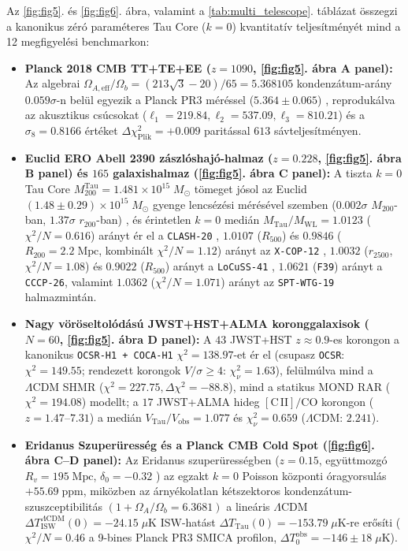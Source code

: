 \documentclass[11pt,a4paper]{article}
\begin{document}
Az \ref{fig:fig5}. és \ref{fig:fig6}. ábra, valamint a \ref{tab:multi_telescope}. táblázat összegzi a kanonikus zéró paraméteres Tau Core ($k = 0$) kvantitatív teljesítményét mind a 12 megfigyelési benchmarkon:
\begin{itemize}
  \item \textbf{Planck 2018 CMB TT+TE+EE ($z = 1090$, \ref{fig:fig5}. ábra A panel):} Az algebrai $\Omega_{A,\mathrm{eff}}/\Omega_b = (213\sqrt{3}-20)/65 = 5.368105$ kondenzátum-arány $0.059\sigma$-n belül egyezik a Planck PR3 méréssel ($5.364 \pm 0.065$) \cite{Planck2018VI}, reprodukálva az akusztikus csúcsokat ($\ell_1 = 219.84, \ell_2 = 537.09, \ell_3 = 810.21$) és a $\sigma_8 = 0.8166$ értéket $\Delta\chi^2_{\mathrm{Plik}} = +0.009$ paritással $613$ sávteljesítményen.
  \item \textbf{Euclid ERO Abell 2390 zászlóshajó-halmaz ($z = 0.228$, \ref{fig:fig5}. ábra B panel) és $165$ galaxishalmaz (\ref{fig:fig5}. ábra C panel):} A tiszta $k = 0$ Tau Core $M_{200}^{\mathrm{Tau}} = 1.481 \times 10^{15}\;M_\odot$ tömeget jósol az Euclid $(1.48 \pm 0.29)\times 10^{15}\;M_\odot$ gyenge lencsézési mérésével szemben ($0.002\sigma$ $M_{200}$-ban, $1.37\sigma$ $r_{200}$-ban) \cite{EuclidEROAbell2390}, és érintetlen $k = 0$ medián $M_{\mathrm{Tau}}/M_{\mathrm{WL}} = 1.0123$ ($\chi^2/N = 0.616$) arányt ér el a \texttt{CLASH-20} \cite{Umetsu2016CLASH}, $1.0107$ ($R_{500}$) és $0.9846$ ($R_{200} = 2.2\;\mathrm{Mpc}$, kombinált $\chi^2/N = 1.12$) arányt az \texttt{X-COP-12} \cite{Eckert2019XCOP}, $1.0032$ ($r_{2500}$, $\chi^2/N = 1.08$) és $0.9022$ ($R_{500}$) arányt a \texttt{LoCuSS-41} \cite{OkabeSmith2016LoCuSS}, $1.0621$ (\texttt{F39}) arányt a \texttt{CCCP-26}, valamint $1.0362$ ($\chi^2/N = 1.071$) arányt az \texttt{SPT-WTG-19} halmazmintán.
  \item \textbf{Nagy vöröseltolódású JWST+HST+ALMA koronggalaxisok ($N = 60$, \ref{fig:fig5}. ábra D panel):} A $43$ JWST+HST $z \approx 0.9$-es korongon \cite{ManceraPina2025} a kanonikus \texttt{OCSR-H1 + COCA-H1} $\chi^2 = 138.97$-et ér el (csupasz \texttt{OCSR}: $\chi^2 = 149.55$; rendezett korongok $V/\sigma \ge 4$: $\chi^2_\nu = 1.63$), felülmúlva mind a $\Lambda\mathrm{CDM}$ SHMR ($\chi^2 = 227.75, \Delta\chi^2 = -88.8$), mind a statikus MOND RAR ($\chi^2 = 194.08$) modellt; a $17$ JWST+ALMA hideg $[\mathrm{C\,II}]/\mathrm{CO}$ korongon ($z = 1.47\text{--}7.31$) a medián $V_{\mathrm{Tau}}/V_{\mathrm{obs}} = 1.077$ és $\chi^2_\nu = 0.659$ ($\Lambda\mathrm{CDM}$: $2.241$).
  \item \textbf{Eridanus Szuperüresség és a Planck CMB Cold Spot (\ref{fig:fig6}. ábra C--D panel):} Az Eridanus szuperürességben ($z = 0.15$, együttmozgó $R_v = 195\;\mathrm{Mpc}$, $\delta_0 = -0.32$ \cite{Kovacs2022Eridanus}) az egzakt $k = 0$ Poisson központi óragyorsulás $+55.69\;\mathrm{ppm}$, miközben az árnyékolatlan kétszektoros kondenzátum-szuszceptibilitás $(1 + \Omega_A/\Omega_b = 6.3681)$ a lineáris $\Lambda\mathrm{CDM}$ $\Delta T_{\mathrm{ISW}}^{\Lambda\mathrm{CDM}}(0) = -24.15\;\mu\mathrm{K}$ ISW-hatást $\Delta T_{\mathrm{Tau}}(0) = -153.79\;\mu\mathrm{K}$-re erősíti ($\chi^2/N = 0.46$ a 9-bines Planck PR3 SMICA profilon, $\Delta T_0^{\mathrm{obs}} = -146 \pm 18\;\mu\mathrm{K}$).
\end{itemize}
\end{document}
